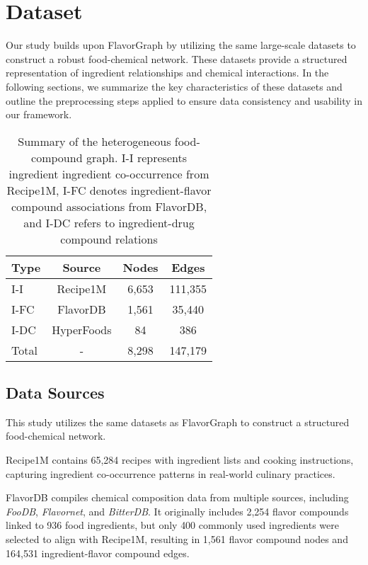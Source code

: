 \section{Dataset}

Our study builds upon {FlavorGraph} \cite{Park2019} by utilizing the same large-scale datasets to construct a robust food-chemical network. These datasets provide a structured representation of ingredient relationships and chemical interactions. In the following sections, we summarize the key characteristics of these datasets and outline the preprocessing steps applied to ensure data consistency and usability in our framework.

\begin{table}[h]
  \centering
  \begin{tabular}{lccc}
    \hline
    {Type} & {Source} & {Nodes} & {Edges} \\
    \hline
    I-I & Recipe1M & 6,653 & 111,355 \\
    I-FC & FlavorDB & 1,561 & 35,440 \\
    I-DC & HyperFoods & 84 & 386 \\
    \hline
    {Total} & - & 8,298 & 147,179 \\
    \hline
  \end{tabular}
  \caption{Summary of the heterogeneous food-compound graph. I-I represents ingredient ingredient co-occurrence from Recipe1M, I-FC denotes ingredient-flavor compound associations from FlavorDB, and I-DC refers to ingredient-drug compound relations}

  \label{tab:graph_summary}
\end{table}

\subsection{Data Sources}
This study utilizes the same datasets as {FlavorGraph} \cite{Park2019} to construct a structured food-chemical network.

{Recipe1M} \cite{Marin2019} contains {65,284} recipes with ingredient lists and cooking instructions, capturing ingredient co-occurrence patterns in real-world culinary practices.

{FlavorDB} compiles chemical composition data from multiple sources, including \textit{FooDB}, \textit{Flavornet}, and \textit{BitterDB}. It originally includes {2,254 flavor compounds} linked to {936 food ingredients}, but only {400 commonly used ingredients} were selected to align with Recipe1M, resulting in {1,561 flavor compound nodes} and {164,531 ingredient-flavor compound edges}.

